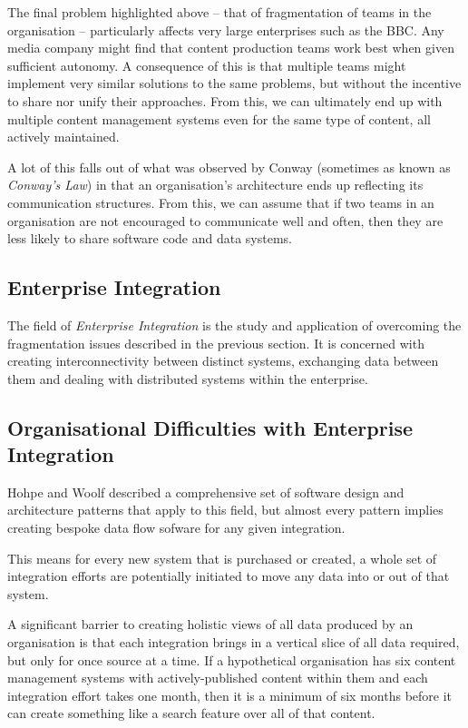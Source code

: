 The final problem highlighted above -- that of fragmentation of teams in the
organisation -- particularly affects very large enterprises such as the BBC.
Any media company might find that content production teams work best when
given sufficient autonomy. A consequence of this is that multiple teams
might implement very similar solutions to the same problems, but without the
incentive to share nor unify their approaches. From this, we can ultimately
end up with multiple content management systems even for the same type of
content, all actively maintained.

A lot of this falls out of what was observed by
Conway\cite{conway1968committees} (sometimes as known as \emph{Conway's Law})
in that an organisation's architecture ends up reflecting its communication
structures. From this, we can assume that if two teams in an organisation
are not encouraged to communicate well and often, then they are less likely to
share software code and data systems.

\subsection{Enterprise Integration}

The field of \emph{Enterprise Integration} is the study and application
of overcoming the fragmentation issues described in the previous
section. It is concerned with creating interconnectivity between
distinct systems, exchanging data between them and dealing with
distributed systems within the enterprise.\cite{vernadat2003enterprise}

\subsection{Organisational Difficulties with Enterprise Integration}
\label{sec:ei-difficulties}

Hohpe and Woolf\cite{hohpe2002enterprise} described a comprehensive
set of software design and architecture patterns that apply to this
field, but almost every pattern implies creating bespoke data flow
sofware for any given integration.

This means for every new system that is purchased or created, a
whole set of integration efforts are potentially initiated to move any
data into or out of that system.

A significant barrier to creating holistic views of all data
produced by an organisation is that each integration brings in a
vertical slice of all data required, but only for once source at a
time. If a hypothetical organisation has six content management
systems with actively-published content within them and each
integration effort takes one month, then it is a minimum of six
months before it can create something like a search feature over all
of that content.

